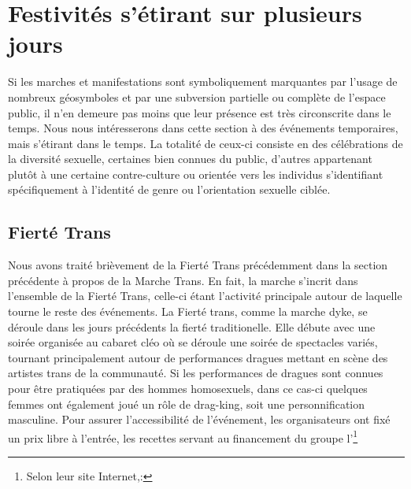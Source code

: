 \section{Festivités s'étirant sur plusieurs jours}
\label{sec:festivitesplusieursjours}
Si les marches et manifestations sont symboliquement marquantes par l'usage de nombreux géosymboles et par une subversion partielle ou complète de l'espace public, il n’en demeure pas moins que leur présence est très circonscrite dans le temps.
Nous nous intéresserons dans cette section à des événements temporaires, mais s'étirant dans le temps.
La totalité de ceux-ci consiste en des célébrations de la diversité sexuelle, certaines bien connues du public, d'autres appartenant plutôt à une certaine contre-culture ou orientée vers les individus s'identifiant spécifiquement à l'identité de genre ou l'orientation sexuelle ciblée.

\subsection{Fierté Trans}
\label{subsec:fiertetrans}
Nous avons traité brièvement de la Fierté Trans précédemment dans la section précédente à propos de la Marche Trans.
En fait, la marche s'incrit dans l'ensemble de la Fierté Trans, celle-ci étant l'activité principale autour de laquelle tourne le reste des événements.
La Fierté trans, comme la marche dyke, se déroule dans les jours précédents la fierté traditionelle.
Elle débute avec une soirée organisée au cabaret cléo où se déroule une soirée de spectacles variés, tournant principalement autour de performances dragues mettant en scène des artistes trans de la communauté.
Si les performances de dragues sont connues pour être pratiquées par des hommes homosexuels, dans ce cas-ci quelques femmes ont également joué un rôle de drag-king, soit une personnification masculine.
Pour assurer l'accessibilité de l'événement, les organisateurs ont fixé un prix libre à l'entrée, les recettes servant au financement du groupe l'\astteq{}\footnote{Selon leur site Internet,: }

